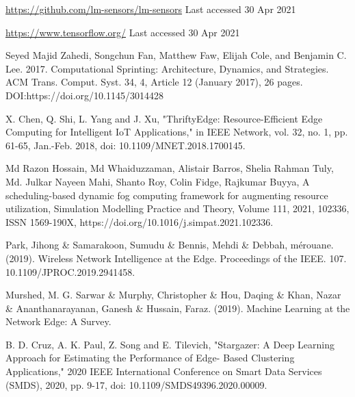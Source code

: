 \documentclass[runningheads]{llncs}
\begin{document}
\begin{thebibliography}{8}
\url{https://github.com/lm-sensors/lm-sensors} Last accessed 30 Apr 2021 


\url{https://www.tensorflow.org/} Last accessed 30 Apr 2021 


Seyed Majid Zahedi, Songchun Fan, Matthew Faw, Elijah Cole, and Benjamin C. Lee. 2017. Computational Sprinting: Architecture, Dynamics, and Strategies. ACM Trans. Comput. Syst. 34, 4, Article 12 (January 2017), 26 pages. DOI:https://doi.org/10.1145/3014428


X. Chen, Q. Shi, L. Yang and J. Xu, "ThriftyEdge: Resource-Efficient Edge Computing for Intelligent IoT Applications," in IEEE Network, vol. 32, no. 1, pp. 61-65, Jan.-Feb. 2018, doi: 10.1109/MNET.2018.1700145.


Md Razon Hossain, Md Whaiduzzaman, Alistair Barros, Shelia Rahman Tuly, Md. Julkar Nayeen Mahi, Shanto Roy, Colin Fidge, Rajkumar Buyya,
A scheduling-based dynamic fog computing framework for augmenting resource utilization,
Simulation Modelling Practice and Theory,
Volume 111, 2021, 102336, ISSN 1569-190X,
https://doi.org/10.1016/j.simpat.2021.102336.


Park, Jihong \& Samarakoon, Sumudu \& Bennis, Mehdi \& Debbah, mérouane. (2019). Wireless Network Intelligence at the Edge. Proceedings of the IEEE. 107. 10.1109/JPROC.2019.2941458. 


Murshed, M. G. Sarwar \& Murphy, Christopher \& Hou, Daqing \& Khan, Nazar \& Ananthanarayanan, Ganesh \& Hussain, Faraz. (2019). Machine Learning at the Network Edge: A Survey. 


B. D. Cruz, A. K. Paul, Z. Song and E. Tilevich, "Stargazer: A Deep Learning Approach for Estimating the Performance of Edge- Based Clustering Applications," 2020 IEEE International Conference on Smart Data Services (SMDS), 2020, pp. 9-17, doi: 10.1109/SMDS49396.2020.00009.



\end{thebibliography}
\end{document}

